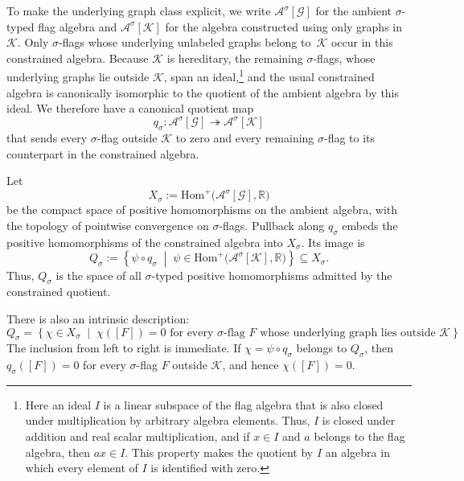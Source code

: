 \documentclass{article}
\newcommand{\R}{\mathbb{R}}
\newcommand{\FlagAlg}[1]{\mathcal{A}^{#1}}
\begin{document}
To make the underlying graph class explicit, we write
\(\FlagAlg{\sigma}[\mathcal G]\) for the ambient
\(\sigma\)-typed flag algebra and
\(\FlagAlg{\sigma}[\mathcal K]\) for the algebra constructed using only graphs
in \(\mathcal K\).  Only \(\sigma\)-flags whose underlying unlabeled graphs
belong to~\(\mathcal K\) occur in this constrained algebra.  Because
\(\mathcal K\) is hereditary, the remaining \(\sigma\)-flags, whose underlying
graphs lie outside \(\mathcal K\), span an ideal,\footnote{Here an ideal \(I\)
is a linear subspace of the flag algebra that is also closed under
multiplication by arbitrary algebra elements.  Thus, \(I\) is closed under
addition and real scalar multiplication, and if \(x\in I\) and \(a\) belongs
to the flag algebra, then \(ax\in I\).  This property makes the quotient by
\(I\) an algebra in which every element of \(I\) is identified with zero.} and the usual constrained
algebra is canonically isomorphic to the quotient of the ambient algebra by
this ideal.  We therefore have a canonical quotient map
\[
  q_\sigma:
  \FlagAlg{\sigma}[\mathcal G]
  \twoheadrightarrow
  \FlagAlg{\sigma}[\mathcal K]
\]
that sends every \(\sigma\)-flag outside \(\mathcal K\) to zero and every
remaining \(\sigma\)-flag to its counterpart in the constrained algebra.

Let
\[
  X_\sigma
  :=
  \mathrm{Hom}^{+}\bigl(\FlagAlg{\sigma}[\mathcal G],\R\bigr)
\]
be the compact space of positive homomorphisms on the ambient
algebra, with the topology of pointwise convergence on \(\sigma\)-flags.
Pullback along \(q_\sigma\) embeds the positive homomorphisms of the constrained
algebra into \(X_\sigma\).  Its image is
\begin{equation}\label{eq:Q-sigma}
  Q_\sigma
  :=
  \left\{
    \psi\circ q_\sigma
    \;\middle|\;
    \psi\in
    \mathrm{Hom}^{+}\bigl(\FlagAlg{\sigma}[\mathcal K],\R\bigr)
  \right\}
  \subseteq X_\sigma.
\end{equation}
Thus, \(Q_\sigma\) is the space of all \(\sigma\)-typed positive homomorphisms
admitted by the constrained quotient.

There is also an intrinsic description:
\begin{equation}\label{eq:Q-sigma-intrinsic}
  Q_\sigma
  =
  \left\{
    \chi\in X_\sigma
    \;\middle|\;
    \chi([F])=0
    \text{ for every \(\sigma\)-flag \(F\) whose underlying graph lies outside
    \(\mathcal K\)}
  \right\}.
\end{equation}
The inclusion from left to right is immediate.  If
\(\chi=\psi\circ q_\sigma\) belongs to \(Q_\sigma\), then
\(q_\sigma([F])=0\) for every \(\sigma\)-flag \(F\) outside \(\mathcal K\),
and hence \(\chi([F])=0\).
\end{document}
